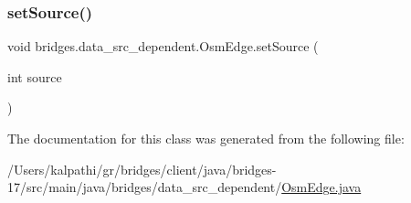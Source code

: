 \mbox{\label{classbridges_1_1data__src__dependent_1_1_osm_edge_aa61fb02ce746b89c26c71cd2f20053e7}} 
\subsubsection{\texorpdfstring{set\+Source()}{setSource()}}
{\footnotesize\ttfamily void bridges.\+data\+\_\+src\+\_\+dependent.\+Osm\+Edge.\+set\+Source (\begin{DoxyParamCaption}\item[{int}]{source }\end{DoxyParamCaption})}



The documentation for this class was generated from the following file\+:\begin{DoxyCompactItemize}
\item 
/\+Users/kalpathi/gr/bridges/client/java/bridges-\/17/src/main/java/bridges/data\+\_\+src\+\_\+dependent/\mbox{\hyperlink{_osm_edge_8java}{Osm\+Edge.\+java}}\end{DoxyCompactItemize}
